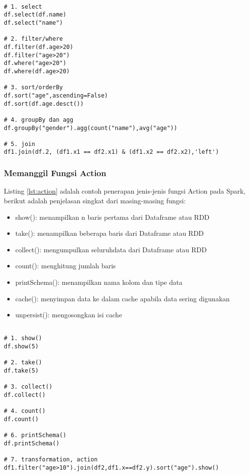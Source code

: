 \begin{lstlisting}[basicstyle=\ttfamily, frame=single,
	columns=fullflexible, keepspaces=true, breaklines=true, label=lst:transformation, caption=Contoh Fungsi Transformation]
	
# 1. select
df.select(df.name)
df.select("name")

# 2. filter/where
df.filter(df.age>20)
df.filter("age>20")
df.where("age>20")
df.where(df.age>20)
 
# 3. sort/orderBy 
df.sort("age",ascending=False)
df.sort(df.age.desct())
 
# 4. groupBy dan agg
df.groupBy("gender").agg(count("name"),avg("age"))

# 5. join
df1.join(df.2, (df1.x1 == df2.x1) & (df1.x2 == df2.x2),'left')

\end{lstlisting}

\subsubsection{Memanggil Fungsi Action}
\noindent Listing \ref{lst:action} adalah contoh penerapan jenis-jenis fungsi Action pada Spark, berikut adalah penjelasan singkat dari masing-masing fungsi:
\begin{itemize}
\item show(): menampilkan n baris pertama dari Dataframe atau RDD
\item take(): menampilkan beberapa baris dari Dataframe atau RDD
\item collect(): mengumpulkan seluruhdata dari Dataframe atau RDD 
\item count(): menghitung jumlah baris
\item printSchema(): menampilkan nama kolom dan tipe data
\item cache(): menyimpan data ke dalam cache apabila data sering digunakan
\item unpersist(): mengosongkan isi cache
\end{itemize}

\begin{lstlisting}[basicstyle=\ttfamily, frame=single,
	columns=fullflexible, keepspaces=true, breaklines=true, label=lst:action, caption=Contoh Fungsi Action]
	
# 1. show()
df.show(5)

# 2. take()
df.take(5)

# 3. collect()
df.collect()

# 4. count()
df.count()

# 6. printSchema()
df.printSchema()

# 7. transformation, action
df1.filter("age>10").join(df2,df1.x==df2.y).sort("age").show()


\end{lstlisting}

